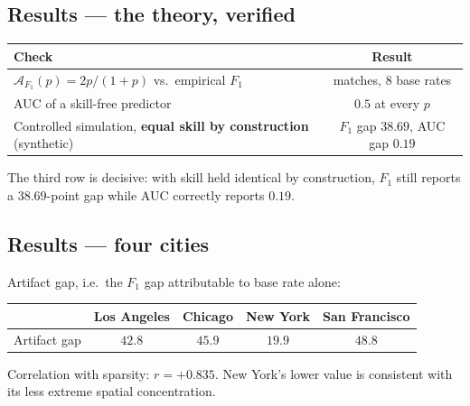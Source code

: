 \documentclass[11pt,a4paper]{article}
\newcommand{\A}{\mathcal{A}}
\begin{document}
\subsection{Results --- the theory, verified}
\begin{center}
\begin{tabular}{lc}
\toprule
Check & Result \\
\midrule
$\A_{F_1}(p)=2p/(1+p)$ vs.\ empirical $F_1$ & matches, 8 base rates \\
AUC of a skill-free predictor & $0.5$ at every $p$ \\
Controlled simulation, \textbf{equal skill by construction} (synthetic) & $F_1$ gap $\mathbf{38.69}$, AUC gap $\mathbf{0.19}$ \\
\bottomrule
\end{tabular}
\end{center}
\noindent The third row is decisive: with skill held identical by construction,
$F_1$ still reports a $38.69$-point gap while AUC correctly reports $0.19$.

\subsection{Results --- four cities}
Artifact gap, i.e.\ the $F_1$ gap attributable to base rate alone:
\begin{center}
\begin{tabular}{lcccc}
\toprule
& Los Angeles & Chicago & New York & San Francisco \\
\midrule
Artifact gap & $42.8$ & $45.9$ & $19.9$ & $48.8$ \\
\bottomrule
\end{tabular}
\end{center}
\noindent Correlation with sparsity: $r = +0.835$. New York's lower value is
consistent with its less extreme spatial concentration.
\end{document}
